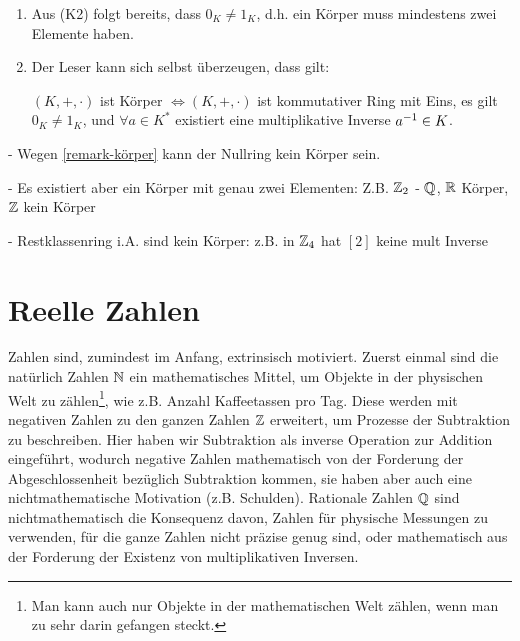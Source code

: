 \begin{remark}[Körper]
    \label{remark-körper}
    \begin{enumerate}
        \item Aus (K2) folgt bereits, dass $0_K \neq 1_K$, d.h. ein Körper muss mindestens zwei Elemente haben.
        \item Der Leser kann sich selbst überzeugen, dass gilt:
        \begin{flushright}
            $(K, +, \cdot)$ ist Körper $\iff (K, +, \cdot)$ ist kommutativer Ring mit Eins, es gilt $0_K \neq 1_K$, und $\forall a \in K^*$ existiert eine multiplikative Inverse $a^{-1} \in K$.
        \end{flushright}
    \end{enumerate}
\end{remark}

\begin{example}
    - Wegen \ref{remark-körper} kann der Nullring kein Körper sein.

    - Es existiert aber ein Körper mit genau zwei Elementen: Z.B. $\mathbb{Z}_2$
    - $\mathbb{Q}$, $\mathbb{R}$ Körper, $\mathbb{Z}$ kein Körper

    - Restklassenring i.A. sind kein Körper: z.B. in $\mathbb{Z}_4$ hat $[2]$ keine mult Inverse
\end{example}




\section{Reelle Zahlen}
\label{sec-numbers}

Zahlen sind, zumindest im Anfang, extrinsisch motiviert. Zuerst einmal sind die natürlich Zahlen $\mathbb{N}$ ein mathematisches Mittel, um Objekte in der physischen Welt zu zählen\footnote{Man kann auch nur Objekte in der mathematischen Welt zählen, wenn man zu sehr darin gefangen steckt.}, wie z.B. Anzahl Kaffeetassen pro Tag. Diese werden mit negativen Zahlen zu den ganzen Zahlen $\mathbb{Z}$ erweitert, um Prozesse der Subtraktion zu beschreiben. Hier haben wir Subtraktion als inverse Operation zur Addition eingeführt, wodurch negative Zahlen mathematisch von der Forderung der Abgeschlossenheit bezüglich Subtraktion kommen, sie haben aber auch eine nichtmathematische Motivation (z.B. Schulden). Rationale Zahlen $\mathbb{Q}$ sind nichtmathematisch die Konsequenz davon, Zahlen für physische Messungen zu verwenden, für die ganze Zahlen nicht präzise genug sind, oder mathematisch aus der Forderung der Existenz von multiplikativen Inversen.

